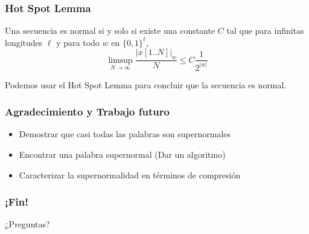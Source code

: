 \documentclass[10pt,mathserif]{beamer}%
\begin{document}
\begin{frame}
  \frametitle{Hot Spot Lemma}

  \begin{definition}
    Una secuencia es normal si y solo si existe una constante $C$ tal que para infinitas longitudes $\ell$ y para todo $w$ en 
    $\{0,1\}^\ell$,
    $$\limsup_{N\to \infty}  \frac{|x[1.. N]|_w }{N} \leq C \frac{1}{2^{|w|}}$$
  \end{definition}
  
  Podemos usar el Hot Spot Lemma para concluir que la secuencia es normal.
      
\end{frame}

\begin{frame}
  \frametitle{Agradecimiento y Trabajo futuro}
  \begin{itemize}
    \item Demostrar que casi todas las palabras son supernormales
    \item Encontrar una palabra supernormal (Dar un algoritmo)
    \item Caracterizar la supernormalidad en términos de compresión
  \end{itemize}
\end{frame}

\begin{frame}
  \frametitle{¡Fin!}
  \begin{center}
  {\Huge ¿Preguntas?}
  \end{center}
\end{frame}
  
\end{document}
